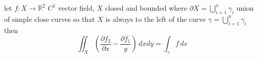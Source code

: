 \documentclass[a4paper, 10pt]{article}
\theoremstyle{definition}
\newcommand{\R}{\mathbb{R}}
\begin{document}
\begin{ntheorem*}
    let \(f: X \to \R^2\) \(C^1\) vector field, \(X\) closed and bounded where \(\partial X = \bigcup_{i = 1}^n \gamma_i\) union of simple close curves so that \(X\)  is always to the left of the curve \(\gamma = \bigcup_{i = 1}^n \gamma_i\) then
    \[\iint_{X} \left(\frac{\partial f_2}{\partial x} - \frac{\partial f_1}{y}\right) \, dx dy = \int_\gamma f \, ds\]
\end{ntheorem*}
\end{document}
